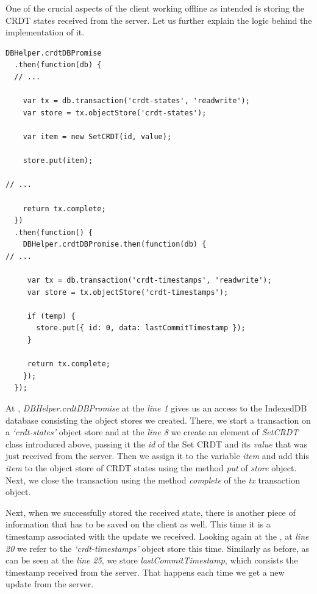 One of the crucial aspects of the client working offline as intended is storing the CRDT states received from the server. Let us further explain the logic behind the implementation of it.

\begin{lstlisting}[caption={Storing CRDT states in the local database after a successful request from the server.}, label={lst:dev9}]
DBHelper.crdtDBPromise
  .then(function(db) {
  // ...

    var tx = db.transaction('crdt-states', 'readwrite');
    var store = tx.objectStore('crdt-states');

    var item = new SetCRDT(id, value);

    store.put(item);

// ...

    return tx.complete;
  })
  .then(function() {
    DBHelper.crdtDBPromise.then(function(db) {
// ...

     var tx = db.transaction('crdt-timestamps', 'readwrite');
     var store = tx.objectStore('crdt-timestamps');

     if (temp) {
       store.put({ id: 0, data: lastCommitTimestamp });
     }

     return tx.complete;
    });
  });
\end{lstlisting}

At , \textit{DBHelper.crdtDBPromise} at the \textit{line 1} gives us an access to the IndexedDB database consisting the object stores we created. There, we start a transaction on a \textit{`crdt-states'} object store and at the \textit{line 8} we create an element of \textit{SetCRDT} class introduced above, passing it the \textit{id} of the Set CRDT and its \textit{value} that was just received from the server. Then we assign it to the variable \textit{item} and add this \textit{item} to the object store of CRDT states using the method \textit{put} of \textit{store} object. Next, we close the transaction using the method \textit{complete} of the \textit{tx} transaction object.

Next, when we successfully stored the received state, there is another piece of information that has to be saved on the client as well. This time it is a timestamp associated with the update we received. Looking again at the , at \textit{line 20} we refer to the \textit{`crdt-timestamps'} object store this time. Similarly as before, as can be seen at the \textit{line 25}, we store \textit{lastCommitTimestamp}, which consists the timestamp received from the server. That happens each time we get a new update from the server.


